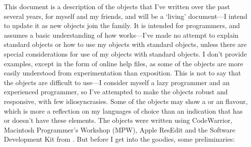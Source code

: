 
This document is a description of the \MaxName{} objects that I've written over the past
several years, for myself and my friends, and will be a `living' document---I intend to update it as new objects join the family.
It is intended for \MaxName{} programmers, and assumes a basic understanding of how \MaxName{} works---I've made no attempt to explain
standard \MaxName{} objects or how to use my objects with standard \MaxName{} objects, unless there are special considerations for use
of my objects with standard \MaxName{} objects.
I don't provide examples, except in the form of online help files, as some of the objects are more easily understood from
experimentation than exposition.
This is not to say that the objects are difficult to use---I consider myself a lazy \MaxName{} programmer and an experienced
 programmer, so I've attempted to make the objects robust and responsive, with few idiosyncrasies.
Some of the objects may show a  or an  flavour, which is more a reflection on
my languages of choice than an indication that \MaxName{} has or doesn't have these elements.
The objects were written using  CodeWarrior,
 Macintosh Programmer's Workshop (MPW), Apple ResEdit\texttrademark{} and the
\MaxName{} Software Development Kit from .
But before I get into the goodies, some preliminaries:
